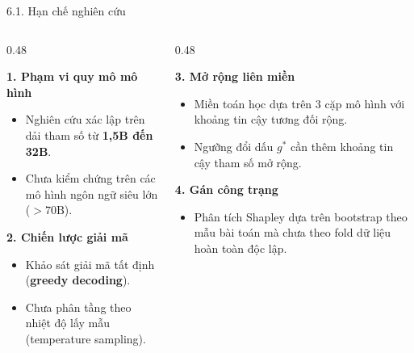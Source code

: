 \documentclass[aspectratio=169,10pt]{beamer}
\begin{document}
\begin{frame}{6.1. Hạn chế nghiên cứu}
  \begin{columns}[t]
    \begin{column}{0.48\textwidth}
      \begin{block}{\textbf{1. Phạm vi quy mô mô hình}}
        \begin{itemize}\small
          \item Nghiên cứu xác lập trên dải tham số từ \textbf{1,5B đến 32B}.
          \item Chưa kiểm chứng trên các mô hình ngôn ngữ siêu lớn ($>70\text{B}$).
        \end{itemize}
      \end{block}
      
      \begin{block}{\textbf{2. Chiến lược giải mã}}
        \begin{itemize}\small
          \item Khảo sát giải mã tất định (\textbf{greedy decoding}).
          \item Chưa phân tầng theo nhiệt độ lấy mẫu (temperature sampling).
        \end{itemize}
      \end{block}
    \end{column}
    
    \begin{column}{0.48\textwidth}
      \begin{block}{\textbf{3. Mở rộng liên miền}}
        \begin{itemize}\small
          \item Miền toán học dựa trên 3 cặp mô hình với khoảng tin cậy tương đối rộng.
          \item Ngưỡng đổi dấu $g^*$ cần thêm khoảng tin cậy tham số mở rộng.
        \end{itemize}
      \end{block}
      
      \begin{block}{\textbf{4. Gán công trạng}}
        \begin{itemize}\small
          \item Phân tích Shapley dựa trên bootstrap theo mẫu bài toán mà chưa theo fold dữ liệu hoàn toàn độc lập.
        \end{itemize}
      \end{block}
    \end{column}
  \end{columns}
\end{frame}
\end{document}
